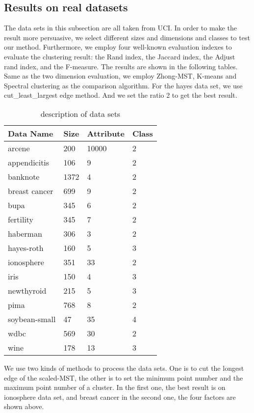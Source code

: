 	\subsection{Results on real datasets}
		The data sets in this subsection are all taken from UCI. In order to make the result more persuasive, we select different sizes and dimensions and classes to test our method. Furthermore, we employ four well-known evaluation indexes to evaluate the clustering result: the Rand index\cite{Rand1971Objective}, the Jaccard index\cite{Halkidi2001On}, the Adjust rand index\cite{Hubert1985Comparing}, and the F-measure\cite{Larsen1999Fast}. The results are shown in the following tables. Same as the two dimension evaluation, we employ Zhong-MST, K-means and Spectral clustering as the comparison algorithm. For the hayes data set,  we use cut\_least\_largest edge method. And we set the ratio 2 to get the best result. 
		\begin{table}[htb]
	      \centering
	      \caption{description of data sets}
	      \label{my-label}
	      \begin{tabular}{|llll|}
	        \hline
	         Data Name & Size  & Attribute  & Class  \\ \hline
	         arcene 		& 200 	& 10000 & 2  \\ 
	         appendicitis 	& 106 	& 9 & 2 \\ 
	         banknote 		& 1372 	& 4 & 2 \\ 
	         breast cancer 	& 699 	& 9 & 2 \\ 
	         bupa 			& 345 	& 6 & 2 \\ 
	         fertility 		& 345 	& 7 & 2 \\ 
	         haberman 		& 306 	& 3 & 2 \\ 
	         hayes-roth 	& 160 	& 5 & 3 \\ 
	         ionosphere 	& 351 	& 33& 2 \\ 
	         iris 			& 150 	& 4 & 3 \\ 
	         newthyroid 	& 215 	& 5 & 3 \\ 
	         pima 			& 768 	& 8 & 2 \\ 
	         soybean-small 	& 47 	& 35& 4 \\ 
	         wdbc 			& 569 	& 30& 2 \\ 
	         wine 			& 178 	& 13& 3 \\ 
	         \hline
	      \end{tabular}
    	\end{table}
		We use two kinds of methods to process the data sets. One is to cut the longest edge of the scaled-MST, the other is to set the minimum point number and the maximum point number of a cluster. In the first one, the best result is on ionosphere data set, and breast cancer in the second one, the four factors are shown above.

